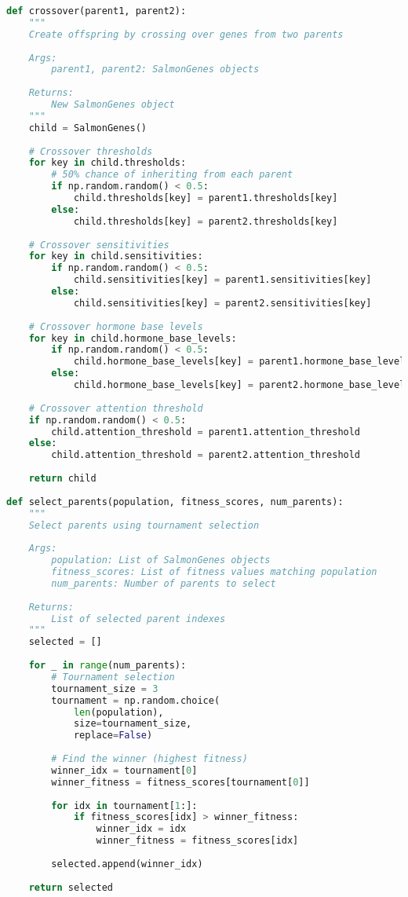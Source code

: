 \documentclass[11pt,a4paper]{article}
\begin{document}
\begin{lstlisting}[language=Python]
def crossover(parent1, parent2):
    """
    Create offspring by crossing over genes from two parents
    
    Args:
        parent1, parent2: SalmonGenes objects
        
    Returns:
        New SalmonGenes object
    """
    child = SalmonGenes()
    
    # Crossover thresholds
    for key in child.thresholds:
        # 50% chance of inheriting from each parent
        if np.random.random() < 0.5:
            child.thresholds[key] = parent1.thresholds[key]
        else:
            child.thresholds[key] = parent2.thresholds[key]
            
    # Crossover sensitivities
    for key in child.sensitivities:
        if np.random.random() < 0.5:
            child.sensitivities[key] = parent1.sensitivities[key]
        else:
            child.sensitivities[key] = parent2.sensitivities[key]
            
    # Crossover hormone base levels
    for key in child.hormone_base_levels:
        if np.random.random() < 0.5:
            child.hormone_base_levels[key] = parent1.hormone_base_levels[key]
        else:
            child.hormone_base_levels[key] = parent2.hormone_base_levels[key]
            
    # Crossover attention threshold
    if np.random.random() < 0.5:
        child.attention_threshold = parent1.attention_threshold
    else:
        child.attention_threshold = parent2.attention_threshold
        
    return child
    
def select_parents(population, fitness_scores, num_parents):
    """
    Select parents using tournament selection
    
    Args:
        population: List of SalmonGenes objects
        fitness_scores: List of fitness values matching population
        num_parents: Number of parents to select
        
    Returns:
        List of selected parent indexes
    """
    selected = []
    
    for _ in range(num_parents):
        # Tournament selection
        tournament_size = 3
        tournament = np.random.choice(
            len(population), 
            size=tournament_size, 
            replace=False)
            
        # Find the winner (highest fitness)
        winner_idx = tournament[0]
        winner_fitness = fitness_scores[tournament[0]]
        
        for idx in tournament[1:]:
            if fitness_scores[idx] > winner_fitness:
                winner_idx = idx
                winner_fitness = fitness_scores[idx]
                
        selected.append(winner_idx)
        
    return selected
\end{lstlisting}
\end{document}
